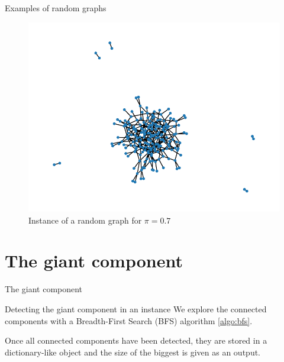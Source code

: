 \documentclass[handout]{beamer}
\begin{document}
\begin{frame}{Examples of random graphs}
    \begin{figure}
        \centering
        \includegraphics[height=.7\textheight]{rg2}
        \caption{Instance of a random graph for $\pi=0.7$}
        \label{fig:rg2}
    \end{figure}
\end{frame}

\section{The giant component}

\begin{frame}{The giant component}
\end{frame}

\begin{frame}{Detecting the giant component in an instance}
    We explore the connected components with a \alert{Breadth-First Search}
    (BFS) algorithm \ref{algo:bfs}.

    Once all connected components have been detected, they are stored in a
    dictionary-like object and the size of the biggest is given as an output.
\end{frame}
\end{document}
